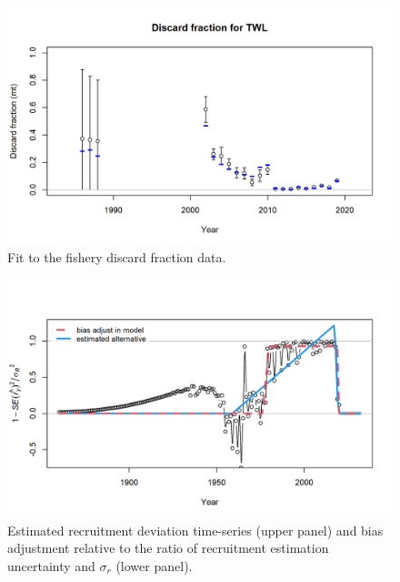 \documentclass[11pt,
  english,
  a4paper,
]{article}
\begin{document}
\begin{figure}
\centering
\includegraphics[width=1\textwidth,height=0.75\textheight]{figs/discard_fitTWL.png}
\caption{Fit to the fishery discard fraction data.\label{fig:discard_fit}}
\end{figure}

\tagmcend\tagstructend

\clearpage


\begin{figure}
\centering
\includegraphics[width=1\textwidth,height=1\textheight]{figs/recruit_fit_bias_adjust.png}
\caption{Estimated recruitment deviation time-series (upper panel) and bias adjustment relative to the ratio of recruitment estimation uncertainty and {\(\sigma_r\)\leavevmode\tagmcend\tagstructend} (lower panel). \label{fig:recdevs_bias}}
\end{figure}
\end{document}

